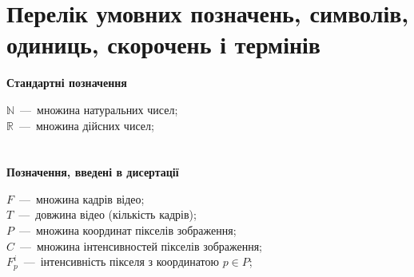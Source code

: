 \chapter*{Перелік умовних позначень, символів, одиниць, скорочень і термінів}

\textbf{Стандартні позначення}

 \noindent$\mathbb{N}$~---~множина натуральних чисел; \\
 \noindent$\mathbb{R}$~---~множина дійсних чисел; \\
\\
\\
\textbf{Позначення, введені в дисертації}

 \noindent$F$~---~множина кадрів відео; \\
 \noindent$T$~---~довжина відео (кількість кадрів); \\
 \noindent$P$~---~множина координат пікселів зображення; \\
 \noindent$C$~---~множина інтенсивностей пікселів зображення; \\
 \noindent$F_p^i$~---~інтенсивність пікселя з координатою $p$$\in$$P$; \\
